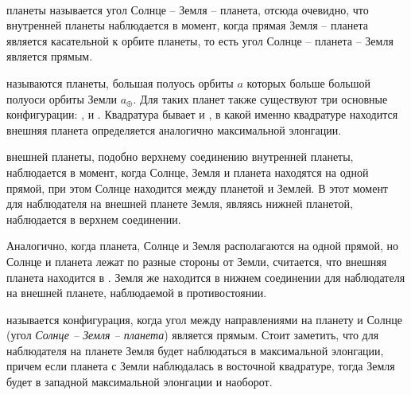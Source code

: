 \begin{minipage}{0.63\tw}
\end{minipage}\\

 планеты называется угол Солнце -- Земля -- планета, отсюда очевидно, что  внутренней планеты наблюдается в момент, когда прямая Земля -- планета является касательной к орбите планеты, то есть угол Солнце -- планета -- Земля является прямым.

 называются планеты, большая полуось орбиты $a$ которых больше большой полуоси орбиты Земли $a_\oplus$. Для таких планет также существуют три основные конфигурации: ,  и . Квадратура бывает  и , в какой именно квадратуре находится внешняя планета определяется аналогично максимальной элонгации.

 внешней планеты, подобно верхнему соединению внутренней планеты, наблюдается в момент, когда Солнце, Земля и планета находятся на одной прямой, при этом Солнце находится между планетой и Землей. В этот момент для наблюдателя на внешней планете Земля, являясь нижней планетой, наблюдается в верхнем соединении.

Аналогично, когда планета, Солнце и Земля располагаются на одной прямой, но Солнце и планета лежат по разные стороны от Земли, считается, что внешняя планета находится в . Земля же находится в нижнем соединении для наблюдателя на внешней планете, наблюдаемой в противостоянии.

 называется конфигурация, когда угол между направлениями на планету и Солнце (угол {\slshape Солнце -- Земля -- планета}) является прямым. Стоит заметить, что для наблюдателя на планете Земля будет наблюдаться в максимальной элонгации, причем если планета с Земли наблюдалась в восточной квадратуре, тогда Земля будет в западной максимальной элонгации и наоборот.

